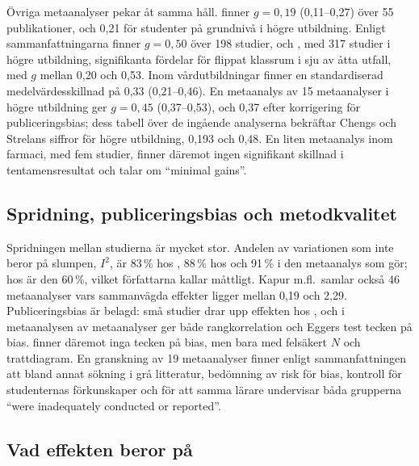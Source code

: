 Övriga metaanalyser pekar åt samma håll.  \textcite[805]{Cheng2019}
finner \(g = 0{,}19\) (0,11--0,27) över 55 publikationer, och 0,21 för
studenter på grundnivå i högre utbildning\autocite[808]{Cheng2019}.
Enligt sammanfattningarna finner \textcite{Strelan2020} \(g = 0{,}50\)
över 198 studier, och
\textcite{Bredow2021}, med 317 studier i högre utbildning, signifikanta
fördelar för flippat klassrum i sju av åtta utfall, med \(g\) mellan 0,20
och 0,53.  Inom vårdutbildningar finner \textcite{HewLo2018} en
standardiserad medelvärdesskillnad på 0,33 (0,21--0,46).  En metaanalys av
15 metaanalyser i högre utbildning ger \(g = 0{,}45\) (0,37--0,53), och
0,37 efter korrigering för publiceringsbias\autocite[140--141]{Hew2021second};
dess tabell över de ingående analyserna bekräftar Chengs och Strelans
siffror för högre utbildning, 0,193 och 0,48\autocite[136]{Hew2021second}.
En liten metaanalys inom farmaci, med fem studier, finner däremot ingen
signifikant skillnad i tentamensresultat och talar om \enquote{minimal
gains}\autocite{Gillette2018}.

\subsection{Spridning, publiceringsbias och metodkvalitet}

Spridningen mellan studierna är mycket stor.  Andelen av variationen som
inte beror på slumpen, \(I^2\), är 83\,\% hos
\textcite[7]{LagSaele2019}, 88\,\% hos \textcite[tabell~3,
s.~10]{vanAlten2019} och 91\,\% i den metaanalys som
\textcite[7]{Kapur2022} gör; hos \textcite[805]{Cheng2019} är den
60\,\%, vilket författarna kallar måttligt.  Kapur m.fl.\ samlar också
46 metaanalyser
vars sammanvägda effekter ligger mellan 0,19 och
2,29\autocite[2]{Kapur2022}.  Publiceringsbias är belagd: små studier drar
upp effekten hos \textcite[9]{LagSaele2019}, och i metaanalysen av
metaanalyser ger både rangkorrelation och Eggers test tecken på
bias\autocite[141]{Hew2021second}.  \textcite[813]{Cheng2019} finner
däremot inga tecken på bias, men bara med felsäkert \(N\) och
trattdiagram.  En granskning av 19 metaanalyser
finner enligt sammanfattningen att bland annat sökning i grå litteratur,
bedömning av risk för bias, kontroll för studenternas förkunskaper och för
att samma lärare undervisar båda grupperna \enquote{were inadequately
conducted or reported}\autocite{Hew2021methodology}.

\subsection{Vad effekten beror på}

